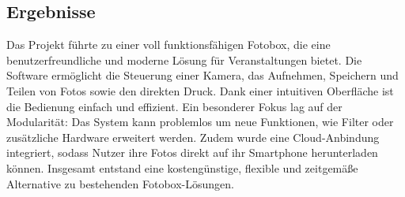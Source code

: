 \documentclass[12pt, a4paper]{article}
\begin{document}
\subsection{Ergebnisse}

Das Projekt führte zu einer voll funktionsfähigen Fotobox, die eine
benutzerfreundliche und moderne Lösung für Veranstaltungen bietet.
Die Software ermöglicht die Steuerung einer Kamera, das Aufnehmen,
Speichern und Teilen von Fotos sowie den direkten Druck. Dank einer intuitiven
Oberfläche ist die Bedienung einfach und effizient.
Ein besonderer Fokus lag auf der Modularität: Das System kann problemlos
um neue Funktionen, wie Filter oder zusätzliche Hardware erweitert werden.
Zudem wurde eine Cloud-Anbindung integriert, sodass Nutzer ihre Fotos direkt
auf ihr Smartphone herunterladen können. Insgesamt entstand eine kostengünstige,
flexible und zeitgemäße Alternative zu bestehenden Fotobox-Lösungen.




\end{document}
